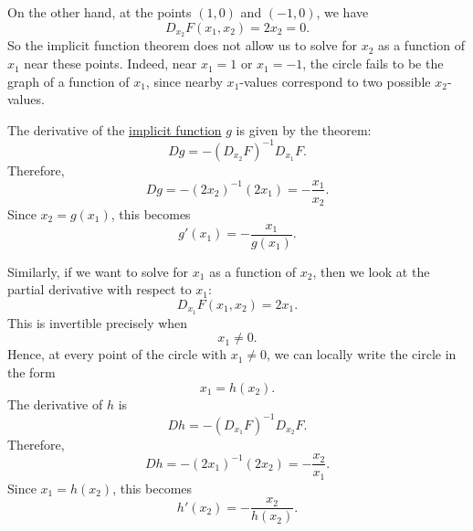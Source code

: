 \begin{example}
		On the other hand, at the points $(1,0)$ and $(-1,0)$, we have
		\begin{equation}
			D_{x_2}F(x_1,x_2) = 2x_2 = 0.
		\end{equation}
		So the implicit function theorem does not allow us to solve for $x_2$ as
		a function of $x_1$ near these points. Indeed, near $x_1=1$ or
		$x_1=-1$, the circle fails to be the graph of a function of $x_1$, since
		nearby $x_1$-values correspond to two possible $x_2$-values.

		The derivative of the \hyperref[thm:implicit-function-theorem]{implicit function} $g$ is given by the theorem:
		\begin{equation}
			Dg
			=
			-\left(D_{x_2}F\right)^{-1}D_{x_1}F.
		\end{equation}
		Therefore,
		\begin{equation}
			Dg
			=
			-(2x_2)^{-1}(2x_1)
			=
			-\frac{x_1}{x_2}.
		\end{equation}
		Since $x_2=g(x_1)$, this becomes
		\begin{equation}
			g'(x_1)
			=
			-\frac{x_1}{g(x_1)}.
		\end{equation}

		Similarly, if we want to solve for $x_1$ as a function of $x_2$, then we
		look at the partial derivative with respect to $x_1$:
		\begin{equation}
			D_{x_1}F(x_1,x_2) = 2x_1.
		\end{equation}
		This is invertible precisely when
		\begin{equation}
			x_1 \neq 0.
		\end{equation}
		Hence, at every point of the circle with $x_1 \neq 0$, we can locally write
		the circle in the form
		\begin{equation}
			x_1 = h(x_2).
		\end{equation}
		The derivative of $h$ is
		\begin{equation}
			Dh
			=
			-\left(D_{x_1}F\right)^{-1}D_{x_2}F.
		\end{equation}
		Therefore,
		\begin{equation}
			Dh
			=
			-(2x_1)^{-1}(2x_2)
			=
			-\frac{x_2}{x_1}.
		\end{equation}
		Since $x_1=h(x_2)$, this becomes
		\begin{equation}
			h'(x_2)
			=
			-\frac{x_2}{h(x_2)}.
		\end{equation}
	\end{example}

